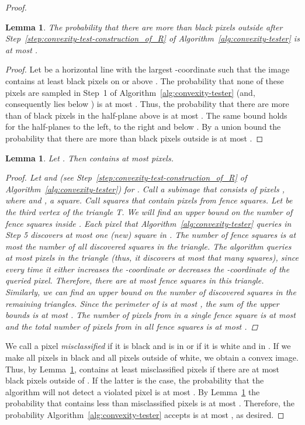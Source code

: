\documentclass[11pt,english]{article}
\newtheorem{lemma}[theorem]{Lemma}
\numberwithin{figure}{section}
\begin{document}
\begin{proof}
\begin{lemma}\label{lem:black-pixels-outside-R}
The probability that there are more than  black pixels outside
 after Step~\ref{step:convexity-test-construction_of_R} of Algorithm~\ref{alg:convexity-tester}
is at most .
\end{lemma}
\begin{proof}
Let  be a horizontal line with the largest -coordinate such that the image
 contains at least  black pixels on or above . The
probability that none of these pixels are sampled in Step~1 of Algorithm~\ref{alg:convexity-tester}
(and, consequently  lies below ) is at most
. Thus, the probability that
there are more than  of black pixels in the half-plane
above  is at most . The same bound holds for the half-planes to the left, to the right and below .
By a union bound the probability that there are more than  black pixels outside  is at most
.
\end{proof}
\begin{lemma}\label{lem:total_number_of_pixels_in_F}
Let . Then  contains at most  pixels.
\begin{proof}
Let  and  (see Step~\ref{step:convexity-test-construction_of_R} of
Algorithm~\ref{alg:convexity-tester}) for .
Call a subimage that consists of pixels , where  and
, a \emph{square}. Call squares that contain pixels from 
\emph{fence squares}. Let  be the third vertex of the triangle T.
We will find an upper bound on the number of fence squares inside .
Each pixel that Algorithm~\ref{alg:convexity-tester}
queries in Step 5 discovers at most one (new) square in . The
number of fence squares is at most the number of all discovered squares in the
triangle. The algorithm queries at most 
pixels in the triangle (thus, it discovers at most that many squares), since every time it either increases the -coordinate or decreases the -coordinate of the queried pixel.
Therefore, there are at most 
fence squares in this triangle. Similarly, we can
find an upper bound on the number of discovered squares in the remaining
triangles. Since the perimeter of  is at most , the sum of the upper bounds is at most
.
The number of pixels from  in a single
fence square is at most  and
the total number of pixels from  in all
fence squares is at most .
\end{proof}
\end{lemma}

We call a pixel {\em misclassified} if it is black and is in  or if it is white and in .
If we make all pixels in  black and all pixels outside of  white, we obtain a
convex image. Thus, by Lemma~\ref{lem:total_number_of_pixels_in_F},
 contains at least  misclassified pixels if there are
at most  black pixels outside of . If the latter is the
case, the probability that the algorithm will not detect a violated pixel
is at most . By
Lemma~\ref{lem:black-pixels-outside-R} the probability that 
contains less than  misclassified pixels is at most
.
Therefore, the probability Algorithm~\ref{alg:convexity-tester} accepts is at most
, as desired.

\end{proof}
\end{document}
